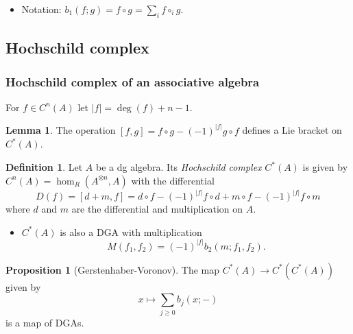 \documentclass{beamer}
\theoremstyle{definition}
\newtheorem{defi}{Definition}
\newtheorem{prop}[theo]{Proposition}
\newtheorem{lem}[theo]{Lemma}
\begin{document}
\begin{frame}
\begin{itemize}
\item<3-> Notation: $b_1(f;g)=f\circ g = \sum_i f\circ_i g$.
\end{itemize}
\end{frame}

\subsection{Hochschild complex}
\begin{frame}
\frametitle{Hochschild complex of an associative algebra}
For $f\in C^n(A)$ let $|f|=\deg(f)+n-1$.\pause
\begin{lem}
The operation $[f,g]=f\circ g-(-1)^{|f|}g\circ f$ defines a Lie bracket on $C^*(A)$. 
\end{lem}\pause

\begin{defi}
Let $A$ be a dg algebra. Its \emph{Hochschild complex} $C^*(A)$ is given by $C^n(A)=\hom_R(A^{\otimes n},A)$ with the differential %
\[
D(f) = [d+m,f] = d\circ f - (-1)^{|f|}f\circ d + m\circ f - (-1)^{|f|}f\circ m %
\]
where $d$ and $m$ are the differential and multiplication on $A$.
\end{defi}

\end{frame}

\begin{frame}
\begin{itemize}
\item $C^*(A)$ is also a DGA with multiplication %
\[
M(f_1,f_2) = (-1)^{|f|}b_2(m;f_1,f_2).
\]
\end{itemize}\pause
\begin{prop}[Gerstenhaber-Voronov]
The map $C^*(A)\to C^*(C^*(A))$ given by 
\[
x\mapsto \sum_{j\geq 0} b_j(x;-)
\]
is a map of DGAs.
\end{prop}
\end{frame}
\end{document}
